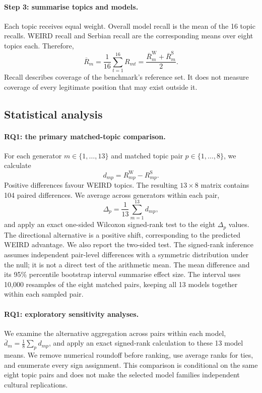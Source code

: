 \paragraph{Step 3: summarise topics and models.}
Each topic receives equal weight. Overall model recall is the mean of
the 16 topic recalls. WEIRD recall and Serbian recall are the corresponding
means over eight topics each. Therefore,
\begin{equation}
\overline R_m=\frac{1}{16}\sum_{t=1}^{16}R_{mt}
=\frac{\overline R_m^{\mathrm W}+\overline R_m^{\mathrm S}}{2}.
\label{eq:model-recall}
\end{equation}
Recall describes coverage of the benchmark's reference set. It does not
measure coverage of every legitimate position that may exist outside it.

\subsection{Statistical analysis}
\label{sec:statistics}
\paragraph{RQ1: the primary matched-topic comparison.}
For each generator $m\in\{1,\ldots,13\}$ and matched topic pair
$p\in\{1,\ldots,8\}$, we calculate
\begin{equation}
d_{mp}=R_{mp}^{\mathrm W}-R_{mp}^{\mathrm S}.
\end{equation}
Positive differences favour WEIRD topics. The resulting $13\times8$
matrix contains 104 paired differences. We average across generators
within each pair,
\begin{equation}
\Delta_p=\frac{1}{13}\sum_{m=1}^{13}d_{mp},
\end{equation}
and apply an exact one-sided Wilcoxon signed-rank test to the eight
$\Delta_p$ values. The directional alternative is a positive shift,
corresponding to the predicted WEIRD advantage. We also report the two-sided
test. The signed-rank inference assumes independent pair-level differences
with a symmetric distribution under the null; it is not a direct test of
the arithmetic mean. The mean difference and its 95\% percentile bootstrap
interval summarise effect size. The interval uses 10,000 resamples of the
eight matched pairs, keeping all 13 models together within each sampled pair.

\paragraph{RQ1: exploratory sensitivity analyses.}
We examine the alternative aggregation across pairs within each model,
$\overline d_m=\frac18\sum_p d_{mp}$, and apply an exact signed-rank
calculation to these 13 model means. We remove numerical roundoff before
ranking, use average ranks for ties, and enumerate every sign assignment.
This comparison is conditional on the same eight topic pairs and does
not make the selected model families independent cultural replications.

